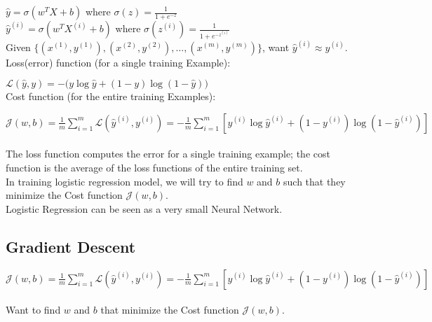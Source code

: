 \documentclass{article}
\begin{document}
    $\hat{y} = \sigma{(w^{T}X + b)}$ where $\sigma(z) = \frac{1}{1+e^{-z}}$\\

    $\hat{y}^{(i)} = \sigma{(w^{T}X^{(i)} + b)}$ where $\sigma(z^{(i)}) = \frac{1}{1+e^{{-z}^{(i)}}}$\\

    Given $\{(x^{(1)}, y^{(1)}), (x^{(2)}, y^{(2)}), \hdots, (x^{(m)}, y^{(m)})\}$, want $\hat{y}^{(i)} \approx y^{(i)}$. \\

    Loss(error) function (for a single training Example):

    $\displaystyle \mathcal{L}(\hat{y}, y) = -(y\log{\hat{y}} + (1-y)\log{(1-\hat{y}))}$\\

    Cost function (for the entire training Examples):

    $\displaystyle \mathcal{J}(w, b) = \frac{1}{m}\sum_{i=1}^{m} \mathcal{L}(\hat{y}^{(i)}, y^{(i)}) = -\frac{1}{m}\sum_{i=1}^{m} [y^{(i)}\log{\hat{y}^{(i)}} + (1-y^{(i)})\log{(1-\hat{y}^{(i)})}]$\\\\

    The loss function computes the error for a single training example; the cost function is the average of the loss functions of the entire training set.\\

    In training logistic regression model, we will try to find $w$ and $b$ such that they minimize the Cost function $\mathcal{J}(w, b)$.\\

    Logistic Regression can be seen as a very small Neural Network.\\


\newpage
\subsection{Gradient Descent}

    $\displaystyle \mathcal{J}(w, b) = \frac{1}{m}\sum_{i=1}^{m} \mathcal{L}(\hat{y}^{(i)}, y^{(i)}) = -\frac{1}{m}\sum_{i=1}^{m} [y^{(i)}\log{\hat{y}^{(i)}} + (1-y^{(i)})\log{(1-\hat{y}^{(i)})}]$\\\\

    Want to find $w$ and $b$ that minimize the Cost function $\mathcal{J}(w,b)$.

    \\
\end{document}
